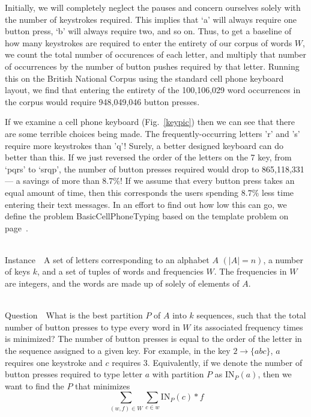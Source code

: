 \documentclass[runningheads]{llncs}
\newcommand{\Instance}{{\sc Instance~}}
\newcommand{\Question}{~\\
{\sc Question~}}
\begin{document}
Initially, we will completely neglect the pauses and concern ourselves solely
with the number of keystrokes required.  This implies that `a' will always
require one button press, `b' will always require two, and so on.  Thus, to get
a baseline of how many keystrokes are required to enter the entirety of our
corpus of words $W$, we count the total number of occurences of each letter,
and multiply that number of occurrences by the number of button pushes
required by that letter.  Running this on the British National Corpus
using the standard cell phone keyboard layout, we find that entering the
entirety of the 100,106,029 word occurrences in the corpus would require
948,049,046 button presses.  

If we examine a cell phone keyboard (Fig.~\ref{keypic}) then we can see that
there are some terrible choices being made.  The frequently-occurring letters
'r' and 's' require more keystrokes than 'q'!  Surely, a better designed
keyboard can do better than this.  If we just reversed the order of the letters
on the 7 key, from `pqrs' to `srqp', the number of button presses required
would drop to 865,118,331 --- a savings of more than $8.7\%$!  If we assume
that every button press takes an equal amount of time, then this corresponds
the users spending $8.7\%$ less time entering their text messages.  In an
effort to find out how low this can go, we define the problem {\sc
BasicCellPhoneTyping} based on the template problem on
page~\pageref{probtemplate}.

\begin{prob}[{\sc BasicCellPhoneTyping}]~\\
\Instance\ A set of letters corresponding to an alphabet $A$ $(|A| =
n)$, a number of keys $k$, and a set of
tuples of words and frequencies $W$.  The frequencies in $W$ are integers,
and the words are made up of solely of elements of $A$. 

\Question\ What is the best partition $P$ of $A$ into $k$ sequences, such
that the total number of button presses to type every word in $W$ its
associated frequency times is minimized?  The number of button presses is equal
to the order of the letter in the sequence assigned to a given key.  For
example, in the key $2\to\{abc\}$, $a$ requires one keystroke and $c$ requires
3.  Equivalently, if we denote the number of button presses required to type
letter $a$ with partition $P$ as $\mathrm{IN}_P(a)$, then we want to find the $P$ that
minimizes $$\sum_{(w,f) \in W}\sum_{c\in w} \mathrm{IN}_P(c) * f$$
\label{bcpt}
\end{prob}
\end{document}
